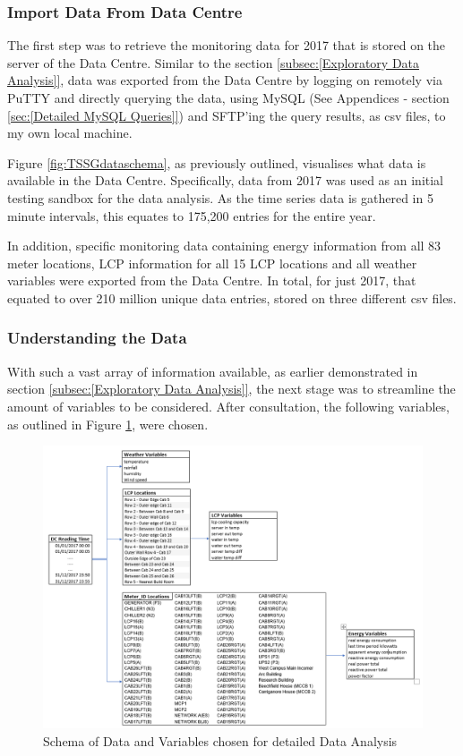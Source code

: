 \documentclass[12pt]{scrartcl}
\begin{document}
\subsubsection{Import Data From Data Centre}
\label{subsubsec:[Import Data From Data Centre]}

The first step was to retrieve the monitoring data for 2017 that is stored on the server of the Data Centre. Similar to the section \ref{subsec:[Exploratory Data Analysis]}, data was exported from the Data Centre by logging on remotely via PuTTY and directly querying the data, using MySQL (See Appendices - section \ref{sec:[Detailed MySQL Queries]}) and SFTP'ing the query results, as csv files, to my own local machine. 

Figure \ref{fig:TSSGdataschema}, as previously outlined, visualises what data is available in the Data Centre. Specifically, data from 2017 was used as an initial testing sandbox for the data analysis. As the time series data is gathered in 5 minute intervals, this equates to 175,200 entries for the entire year. 

In addition, specific monitoring data containing energy information from all 83 meter locations, \gls{LCP} information for all 15 \gls{LCP} locations and all weather variables were exported from the Data Centre. In total, for just 2017, that equated to over 210 million unique data entries, stored on three different csv files. 

\subsubsection{Understanding the Data}
\label{subsubsec:[Understanding the Data]}

With such a vast array of information available, as earlier demonstrated in section \ref{subsec:[Exploratory Data Analysis]}, the next stage was to streamline the amount of variables to be considered. After consultation, the following variables, as outlined in Figure \ref{fig:finalvariables}, were chosen.  

\begin{figure}[H]
  \caption{Schema of Data and Variables chosen for detailed Data Analysis}
  \label{fig:finalvariables}
  \centering
    \includegraphics[scale=0.40]{finalvariables}
\end{figure} 
\end{document}
